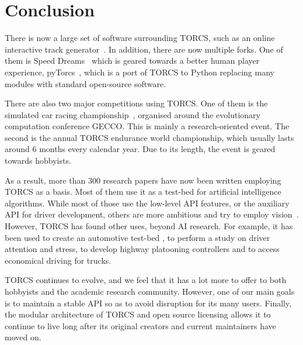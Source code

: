 \documentclass[a4paper]{article}
\begin{document}
\section{Conclusion}

There is now a large set of software surrounding TORCS, such as an online interactive track generator~\cite{cardamone2011interactive}. In addition, there are now multiple forks. One of them is Speed Dreams~\cite{speed-dreams} which is geared towards a better human player experience, pyTorcs~\cite{pytorcs}, which is a port of TORCS to Python replacing many modules  with standard open-source software.

There are also two major competitions using TORCS. One of them is the simulated car racing championship~\cite{car-racing}, organised around the evolutionary computation conference GECCO. This is mainly a research-oriented event. The second is the annual TORCS endurance world championship\cite{torcs-endurance}, which usually lasts around 6 months every calendar year. Due to its length, the event is geared towards hobbyists.

As a result, more than 300 research papers have now been written employing TORCS as a basis. Most of them use it as a test-bed for artificial intelligence algorithms. While most of those use the low-level API features, or the auxiliary API for driver development\cite{caldeiratorcs}, others are more ambitious and try to employ vision~\cite{koutnikevolving,tran2010towards}. 
However, TORCS has found other uses, beyond AI research. For example, it has been used to create an automotive test-bed \cite{drolia2011autoplug}, to perform a study on driver attention and stress\cite{benoit2009multimodal}, to develop highway platooning controllers and to access economical driving for trucks\cite{bogoni2012use}.

TORCS continues to evolve, and we feel that it has a lot more to offer to both hobbyists and the academic research community. However, one of our main goals is to maintain a stable API so as to avoid disruption for its many users. Finally, the modular architecture of TORCS and open source licensing allows it to continue to live long after its original creators and current maintainers have moved on. 




\end{document}
